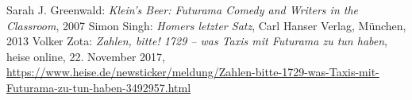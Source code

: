 {{\begin{thebibliography}{99999}
   Sarah J. Greenwald: \textit{Klein's Beer: Futurama Comedy and Writers in the Classroom}, 2007
   Simon Singh: \textit{Homers letzter Satz}, Carl Hanser Verlag, München, 2013
   Volker Zota: \textit{Zahlen, bitte! 1729 -- was Taxis mit Futurama zu tun haben}, heise online, 22. November 2017, \href{https://www.heise.de/newsticker/meldung/Zahlen-bitte-1729-was-Taxis-mit-Futurama-zu-tun-haben-3492957.html}{\url{https://www.heise.de/newsticker/meldung/Zahlen-bitte-1729-was-Taxis-mit-Futurama-zu-tun-haben-3492957.html}}
\end{thebibliography}
}
}


